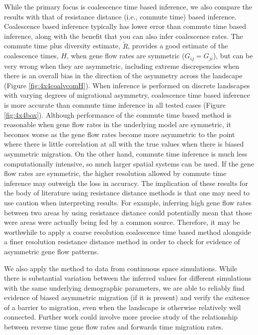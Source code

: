 \documentclass{article}
\newcommand{\comdist}{\widetilde R}
\begin{document}
While the primary focus is coalescence time based inference,
we also compare the results with that of resistance distance (i.e., commute time) based inference.
Coalescence based inference typically has lower error than commute time based inference,
along with the benefit that you can also infer coalescence rates. 
The commute time plus diversity estimate, $\comdist$, 
provides a good estimate of the coalescence times, $H$,
when gene flow rates are symmetric ($G_{ij} = G_{ji}$), 
but can be very wrong when they are asymmetric, 
including extreme discrepencies 
when there is an overall bias in the direction of the asymmetry across the landscape 
(Figure \ref{fig:4x4coalvcomH}).
When inference is performed on discrete landscapes 
with varying degrees of migrational asymmetry, 
coalescence time based inference is more accurate than commute time inference in all tested cases
(Figure \ref{fig:4x4box}).
Although performance of the commute time based method is reasonable 
when gene flow rates in the underlying model are symmetric, 
it becomes worse as the gene flow rates become more asymmetric 
to the point where there is little correlation at all with the true values 
when there is biased asymmetric migration.
On the other hand, commute time inference is much less computationally intensive, 
so much larger spatial systems can be used.
If the gene flow rates are symmetric, the higher resolution allowed by commute time inference
may outweigh the loss in accuracy.
The implication of these results for the body of literature using resistance distance methods
is that one may need to use caution when interpreting results.
For example, inferring high gene flow rates between two areas by using resistance distance
could potentially mean that those were areas were actually being fed by a common source.
Therefore, it may be worthwhile to apply a coarse resolution coalescence time based method 
alongside a finer resolution resistance distance method 
in order to check for evidence of asymmetric gene flow patterns.

We also apply the method to data from continuous space simulations. 
While there is substantial variation between the inferred values 
for different simulations with the same underlying demographic parameters, 
we are able to reliably find evidence of biased asymmetric migration (if it is present)
and verify the exitence of a barrier to migration, 
even when the landscape is otherwise relatively well connected.
Further work could involve more precise study of the relationship
between reverse time gene flow rates and forwards time migration rates.
\end{document}

